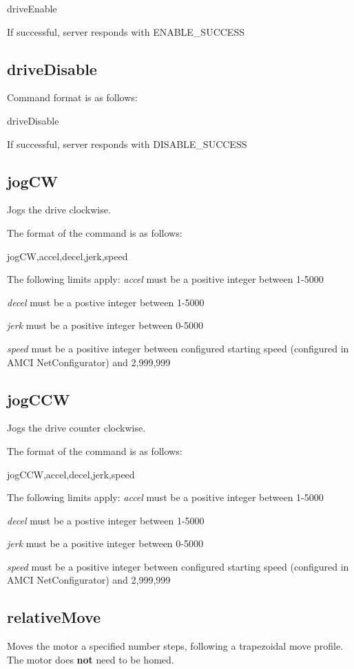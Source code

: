 {\ttfamily drive\+Enable}

If successful, server responds with {\ttfamily E\+N\+A\+B\+L\+E\+\_\+\+S\+U\+C\+C\+E\+S\+S}\hypertarget{index_driveDisable}{}\subsection{drive\+Disable}\label{index_driveDisable}
Command format is as follows\+:

{\ttfamily drive\+Disable}

If successful, server responds with {\ttfamily D\+I\+S\+A\+B\+L\+E\+\_\+\+S\+U\+C\+C\+E\+S\+S}\hypertarget{index_jogCW}{}\subsection{jog\+C\+W}\label{index_jogCW}
Jogs the drive clockwise.

The format of the command is as follows\+:

{\ttfamily jog\+C\+W,accel,decel,jerk,speed}

The following limits apply\+: {\itshape accel} must be a positive integer between 1-\/5000

{\itshape decel} must be a postive integer between 1-\/5000

{\itshape jerk} must be a positive integer between 0-\/5000

{\itshape speed} must be a positive integer between configured starting speed (configured in A\+M\+C\+I Net\+Configurator) and 2,999,999\hypertarget{index_jogCCW}{}\subsection{jog\+C\+C\+W}\label{index_jogCCW}
Jogs the drive counter clockwise.

The format of the command is as follows\+:

{\ttfamily jog\+C\+C\+W,accel,decel,jerk,speed}

The following limits apply\+: {\itshape accel} must be a positive integer between 1-\/5000

{\itshape decel} must be a postive integer between 1-\/5000

{\itshape jerk} must be a positive integer between 0-\/5000

{\itshape speed} must be a positive integer between configured starting speed (configured in A\+M\+C\+I Net\+Configurator) and 2,999,999\hypertarget{index_relativeMove}{}\subsection{relative\+Move}\label{index_relativeMove}
Moves the motor a specified number steps, following a trapezoidal move profile. The motor does {\bfseries not} need to be homed.

